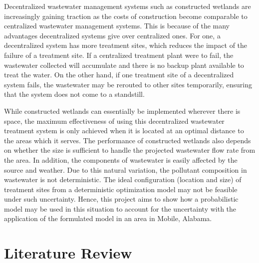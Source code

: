 \documentclass[preprint,12pt,authoryear]{elsarticle}
\begin{document}
Decentralized wastewater management systems such as constructed wetlands are increasingly gaining traction as the costs of construction become comparable to centralized wastewater management systems. This is because of the many advantages decentralized systems give over centralized ones. For one, a decentralized system has more treatment sites, which reduces the impact of the failure of a treatment site. If a centralized treatment plant were to fail, the wastewater collected will accumulate and there is no backup plant available to treat the water. On the other hand, if one treatment site of a decentralized system fails, the wastewater may be rerouted to other sites temporarily, ensuring that the system does not come to a standstill. 

While constructed wetlands can essentially be implemented wherever there is space, the maximum effectiveness of using this decentralized wastewater treatment system is only achieved when it is located at an optimal distance to the areas which it serves. The performance of constructed wetlands also depends on whether the size is sufficient to handle the projected wastewater flow rate from the area. In addition, the components of wastewater is easily affected by the source and weather. Due to this natural variation, the pollutant composition in wastewater is not deterministic. The ideal configuration (location and size) of treatment sites from a deterministic optimization model may not be feasible under such uncertainty. Hence, this project aims to show how a probabilistic model may be used in this situation to account for the uncertainty with the application of the formulated model in an area in Mobile, Alabama. 

\section{Literature Review}
\end{document}
